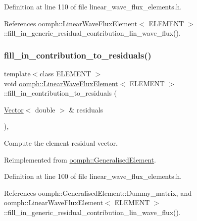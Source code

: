 Definition at line 110 of file linear\+\_\+wave\+\_\+flux\+\_\+elements.\+h.



References oomph\+::\+Linear\+Wave\+Flux\+Element$<$ E\+L\+E\+M\+E\+N\+T $>$\+::fill\+\_\+in\+\_\+generic\+\_\+residual\+\_\+contribution\+\_\+lin\+\_\+wave\+\_\+flux().

\mbox{\label{classoomph_1_1LinearWaveFluxElement_a1bc14657ec786579cc01096f42e8c30c}} 
\subsubsection{\texorpdfstring{fill\+\_\+in\+\_\+contribution\+\_\+to\+\_\+residuals()}{fill\_in\_contribution\_to\_residuals()}}
{\footnotesize\ttfamily template$<$class E\+L\+E\+M\+E\+NT $>$ \\
void \hyperlink{classoomph_1_1LinearWaveFluxElement}{oomph\+::\+Linear\+Wave\+Flux\+Element}$<$ E\+L\+E\+M\+E\+NT $>$\+::fill\+\_\+in\+\_\+contribution\+\_\+to\+\_\+residuals (\begin{DoxyParamCaption}\item[{\hyperlink{classoomph_1_1Vector}{Vector}$<$ double $>$ \&}]{residuals }\end{DoxyParamCaption})\hspace{0.3cm}{\ttfamily [inline]}, {\ttfamily [virtual]}}



Compute the element residual vector. 



Reimplemented from \hyperlink{classoomph_1_1GeneralisedElement_a310c97f515e8504a48179c0e72c550d7}{oomph\+::\+Generalised\+Element}.



Definition at line 100 of file linear\+\_\+wave\+\_\+flux\+\_\+elements.\+h.



References oomph\+::\+Generalised\+Element\+::\+Dummy\+\_\+matrix, and oomph\+::\+Linear\+Wave\+Flux\+Element$<$ E\+L\+E\+M\+E\+N\+T $>$\+::fill\+\_\+in\+\_\+generic\+\_\+residual\+\_\+contribution\+\_\+lin\+\_\+wave\+\_\+flux().

